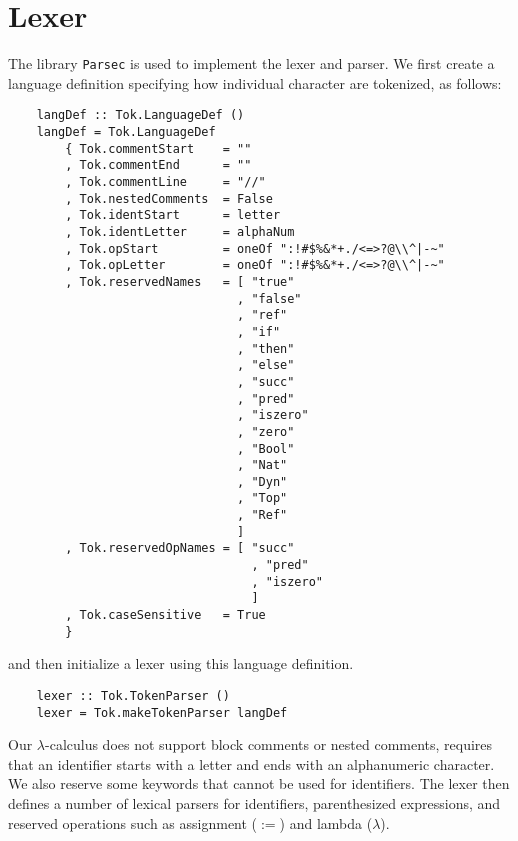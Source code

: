 \section{Lexer}
The library \texttt{Parsec} is used to implement the lexer and parser. 
We first create a language definition specifying how individual character are tokenized, as follows:
\begin{lstlisting}
    langDef :: Tok.LanguageDef ()
    langDef = Tok.LanguageDef
        { Tok.commentStart    = ""  
        , Tok.commentEnd      = ""
        , Tok.commentLine     = "//"
        , Tok.nestedComments  = False
        , Tok.identStart      = letter 
        , Tok.identLetter     = alphaNum 
        , Tok.opStart         = oneOf ":!#$%&*+./<=>?@\\^|-~"
        , Tok.opLetter        = oneOf ":!#$%&*+./<=>?@\\^|-~"
        , Tok.reservedNames   = [ "true"
                                , "false"
                                , "ref"
                                , "if"
                                , "then"
                                , "else"
                                , "succ"
                                , "pred"
                                , "iszero"
                                , "zero"
                                , "Bool"
                                , "Nat"
                                , "Dyn"
                                , "Top"
                                , "Ref" 
                                ]
        , Tok.reservedOpNames = [ "succ"
                                  , "pred"
                                  , "iszero" 
                                  ]
        , Tok.caseSensitive   = True
        }
\end{lstlisting}
and then initialize a lexer using this language definition.
\begin{lstlisting}
    lexer :: Tok.TokenParser ()
    lexer = Tok.makeTokenParser langDef
\end{lstlisting}

Our $\lambda$-calculus does not support block comments or nested comments, requires that an identifier starts with a 
letter and ends with an alphanumeric character. We also reserve some keywords that cannot be used for identifiers. 
The lexer then defines a number of lexical parsers for identifiers, parenthesized expressions, 
and reserved operations such as assignment ($:=$) and lambda ($\lambda$). 

